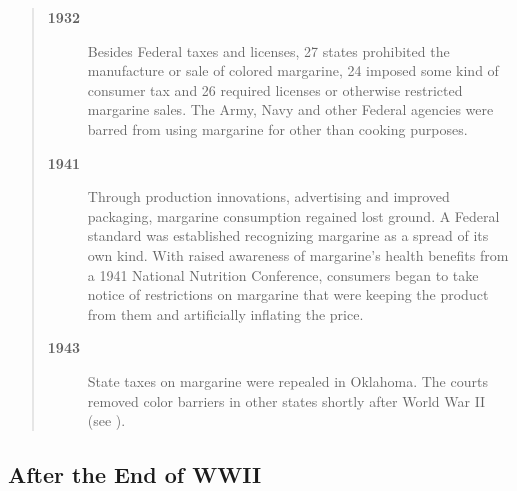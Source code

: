 \documentclass[serv,blindrev]{informs-serv}
\begin{document}
\begin{quotation}
\begin{description}
\item[\bf 1932] Besides Federal taxes and licenses, 27 states prohibited
the manufacture or sale of colored margarine, 24 imposed some kind
of  consumer tax and 26 required licenses or otherwise restricted
margarine sales. The Army, Navy and other Federal agencies were
barred from using margarine for other than cooking purposes.

\item[\bf 1941] Through production innovations, advertising and improved
packaging, margarine consumption regained lost ground. A Federal
standard  was established recognizing margarine as a spread of its
own kind. With raised awareness of margarine's health benefits from
a 1941 National Nutrition Conference, consumers began to take notice
of restrictions on margarine that were keeping the product from them
and artificially inflating the price.

\item[\bf 1943] State taxes on margarine were repealed in Oklahoma. The courts
removed color barriers in other states shortly after World War II (see \citealt{tjp}).

\end{description}

\end{quotation}


\subsection{After the End of WWII}
\end{document}
